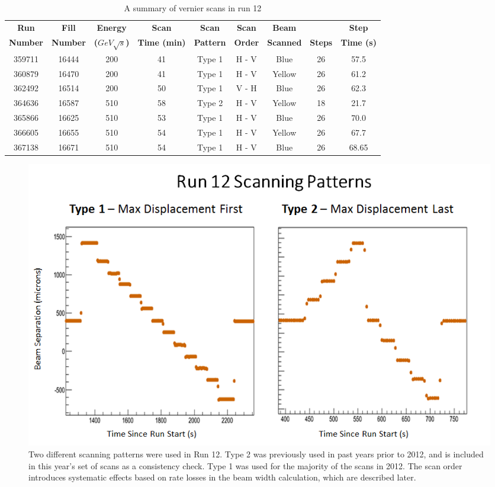 \begin{table}
\centering
\begin{tabular}{ccccccccc}
\toprule
\textbf{Run}    & \textbf{Fill}   & \textbf{Energy}          & \textbf{Scan}       & \textbf{Scan}    & \textbf{Scan}  & \textbf{Beam}    &                & \textbf{Step}     \\
\textbf{Number} & \textbf{Number} & \textbf{($GeV\sqrt{s}$)} & \textbf{Time (min)} & \textbf{Pattern} & \textbf{Order} & \textbf{Scanned} & \textbf{Steps} & \textbf{Time (s)} \\
\midrule
359711 & 16444 & 200 & 41 & Type 1 & H - V & Blue  & 26 & 57.5 \\
360879 & 16470 & 200 & 41 & Type 1 & H - V & Yellow& 26 & 61.2 \\
362492 & 16514 & 200 & 50 & Type 1 & V - H & Blue  & 26 & 62.3 \\
364636 & 16587 & 510 & 58 & Type 2 & H - V & Yellow& 18 & 21.7 \\
365866 & 16625 & 510 & 53 & Type 1 & H - V & Blue  & 26 & 70.0 \\
366605 & 16655 & 510 & 54 & Type 1 & H - V & Yellow& 26 & 67.7 \\
367138 & 16671 & 510 & 54 & Type 1 & H - V & Blue  & 26 & 68.65\\
\bottomrule
\end{tabular}
\caption{ A summary of vernier scans in run 12 }
\label{tab:global_scan_summary}
\end{table}

\begin{figure}[ht]
\begin{center}
\includegraphics[width=0.75\linewidth]{./figures/scan_patterns}
\caption{ Two different scanning patterns were used in Run 12. Type 2 was previously
used in past years prior to 2012, and is included in this year's set of scans as a consistency check.
Type 1 was used for the majority of the scans in 2012. The scan order introduces
systematic effects based on rate losses in the beam width calculation, which are described
later.}
\label{fig:scan_patterns}
\end{center}
\end{figure}

\setcounter{page}{1}

\clearpage

\resetlinenumber

\clearpage

\resetlinenumber

\tableofcontents

\clearpage

\resetlinenumber
